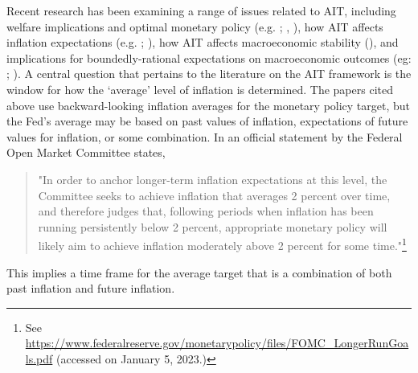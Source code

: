 \documentclass[english,authoryear,12pt]{elsarticle}
\begin{document}
Recent research has been examining a range of issues related to AIT, including welfare implications and optimal monetary policy (e.g. \citealp{budianto2020}; \citealp{eo2020}, \citealp{nessen2005}), how AIT affects inflation expectations (e.g. \citealp{coibion2020}; \citealp{hoffmann2022}), how AIT affects macroeconomic stability (\citealp{piergallini2022}), and implications for boundedly-rational expectations on macroeconomic outcomes (eg: \citealp{honka2021}; \citealp{budianto2020}). A central question that pertains to the literature on the AIT framework is the window for how the `average' level of inflation is determined. The papers cited above use backward-looking inflation averages for the monetary policy target, but the Fed's average may be based on past values of inflation, expectations of future values for inflation, or some combination. In an official statement by the Federal Open Market Committee states,

\vspace*{-1pc}\begin{quote}
	"In order to anchor longer-term inflation expectations at this level, the Committee seeks to achieve inflation that averages 2 percent over time, and therefore judges that, following periods when inflation has been running persistently below 2 percent, appropriate monetary policy will likely aim to achieve inflation moderately above 2 percent for some time."\footnote{See \url{https://www.federalreserve.gov/monetarypolicy/files/FOMC_LongerRunGoals.pdf} (accessed on January 5, 2023.)}
\end{quote}

\vspace*{-1pc} This implies a time frame for the average target that is a combination of both past inflation and future inflation.
\end{document}
